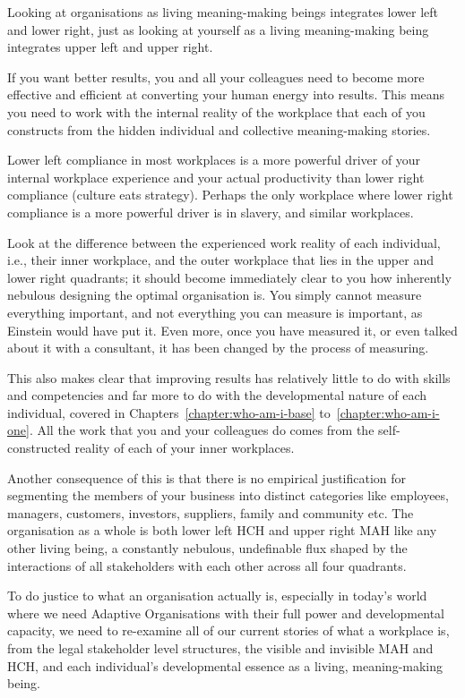 Looking at organisations as living meaning\hyp{}making beings integrates lower left and lower right, just as looking at yourself as a living meaning\hyp{}making being integrates upper left and upper right. 


If you want better results, you and all your colleagues need to become more effective and efficient at converting your human energy into results. This means you need to work with the internal reality of the workplace that each of you constructs from the hidden individual and collective meaning\hyp{}making stories.


Lower left compliance in most workplaces is a more powerful driver of your internal workplace experience and your actual productivity than lower right compliance (culture eats strategy). Perhaps the only workplace where lower right compliance is a more powerful driver is in slavery, and similar workplaces.


Look at the difference between the experienced work reality of each individual, i.e., their inner workplace, and the outer workplace that lies in the upper and lower right quadrants; it should become immediately clear to you how inherently nebulous designing the optimal organisation is. You simply cannot measure everything important, and not everything you can measure is important, as Einstein would have put it. Even more, once you have measured it, or even talked about it with a consultant, it has been changed by the process of measuring. 


This also makes clear that improving results has relatively little to do with skills and competencies and far more to do with the developmental nature of each individual, covered in Chapters~\ref{chapter:who-am-i-base} to~\ref{chapter:who-am-i-one}. All the work that you and your colleagues do comes from the self-constructed reality of each of your inner workplaces.


Another consequence of this is that there is no empirical justification for segmenting the members of your business into distinct categories like employees, managers, customers, investors, suppliers, family and community etc. The organisation as a whole is both lower left HCH and upper right MAH like any other living being, a constantly nebulous, undefinable flux shaped by the interactions of all stakeholders with each other across all four quadrants. 


To do justice to what an organisation actually is, especially in today's world where we need Adaptive Organisations with their full power and developmental capacity, we need to re-examine all of our current stories of what a workplace is, from the legal stakeholder level structures, the visible and invisible MAH and HCH, and each individual's developmental essence as a living, meaning\hyp{}making being.


